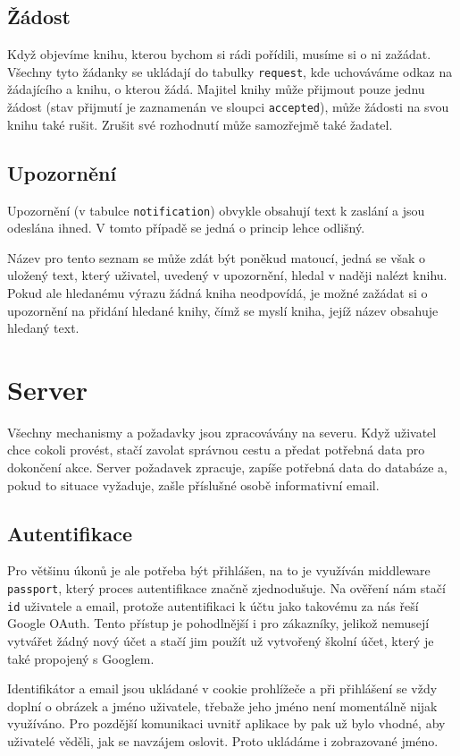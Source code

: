 \documentclass[a4paper,oneside,12pt]{report}
\begin{document}
\section{Žádost}
Když objevíme knihu, kterou bychom si rádi pořídili, musíme si o ni zažádat. Všechny tyto
žádanky se ukládají do tabulky \texttt{request}, kde uchováváme odkaz na žádajícího
a knihu, o kterou žádá. Majitel knihy může přijmout pouze jednu žádost (stav přijmutí je
zaznamenán ve sloupci \texttt{accepted}), může žádosti na svou knihu také rušit.
Zrušit své rozhodnutí může samozřejmě také žadatel.

\section{Upozornění}
Upozornění (v tabulce \texttt{notification}) obvykle obsahují text k zaslání a jsou
odeslána ihned. V tomto případě se jedná o princip lehce odlišný.

Název pro tento seznam se může zdát být poněkud matoucí, jedná se však o uložený text,
který uživatel, uvedený v upozornění, hledal v naději nalézt knihu. Pokud ale hledanému
výrazu žádná kniha neodpovídá, je možné zažádat si o upozornění na přidání hledané knihy,
čímž se myslí kniha, jejíž název obsahuje hledaný text.


\chapter{Server}
Všechny mechanismy a požadavky jsou zpracovávány na severu. Když uživatel chce cokoli
provést, stačí zavolat správnou cestu a předat potřebná data pro dokončení akce. Server
požadavek zpracuje, zapíše potřebná data do databáze a, pokud to situace vyžaduje, zašle
příslušné osobě informativní email.

\section{Autentifikace}
Pro většinu úkonů je ale potřeba být přihlášen, na to je využíván middleware
\texttt{passport}, který proces autentifikace značně zjednodušuje. Na ověření nám
stačí \texttt{id} uživatele a email, protože autentifikaci k účtu jako takovému
za nás řeší Google OAuth. Tento přístup je pohodlnější i pro zákazníky, jelikož nemusejí
vytvářet žádný nový účet a stačí jim použít už vytvořený školní účet, který je také
propojený s Googlem.

Identifikátor a email jsou ukládané v cookie prohlížeče a při přihlášení se vždy doplní o
obrázek a jméno uživatele, třebaže jeho jméno není momentálně nijak využíváno. Pro
pozdější komunikaci uvnitř aplikace by pak už bylo vhodné, aby uživatelé věděli, jak se
navzájem oslovit. Proto ukládáme i zobrazované jméno.
\end{document}
